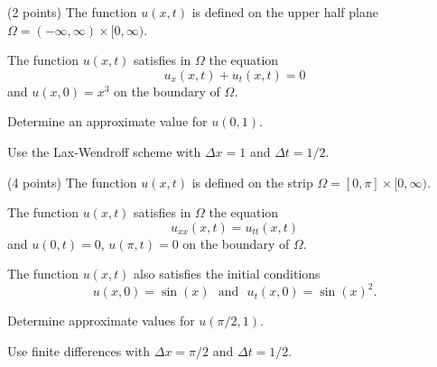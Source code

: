 \begin{teilaufgaben}
\item (2 points)
The function $u(x,t)$ is defined on the upper half plane
$\Omega = (-\infty,\infty) \times [0,\infty)$.

\vspace{2mm}

The function $u(x,t)$ satisfies in $\Omega$ the equation
\[
u_{x}(x,t) + u_{t}(x,t) = 0
\]
and  $u(x,0) = x^3$ on the boundary of $\Omega$.

\vspace{2mm}

Determine an approximate value for $u(0,1)$. 

\vspace{2mm}

Use the Lax-Wendroff scheme with $\Delta x = 1$ and $\Delta t = 1/2.$

\vspace{8mm}

\item (4 points)
The function $u(x,t)$ is defined on the strip
$\Omega = [0, \pi] \times [0,\infty)$.

\vspace{2mm}

The function $u(x,t)$ satisfies in $\Omega$ the equation
\[
u_{xx}(x,t) = u_{tt}(x,t)
\]
and  $u(0,t) = 0$, $u(\pi,t) = 0$ on the boundary of $\Omega$. 

\vspace{2mm}

The function $u(x,t)$ also satisfies the initial conditions
\[
u(x,0) = \sin(x) \ \ \ \mbox{and} \ \ \ u_t(x,0) = \sin(x)^2.
\]

\vspace{2mm}

Determine approximate values for $u(\pi/2,1)$.

\vspace{2mm}

Use finite differences with $\Delta x = \pi/2$ and $\Delta t = 1/2.$

\end{teilaufgaben}


